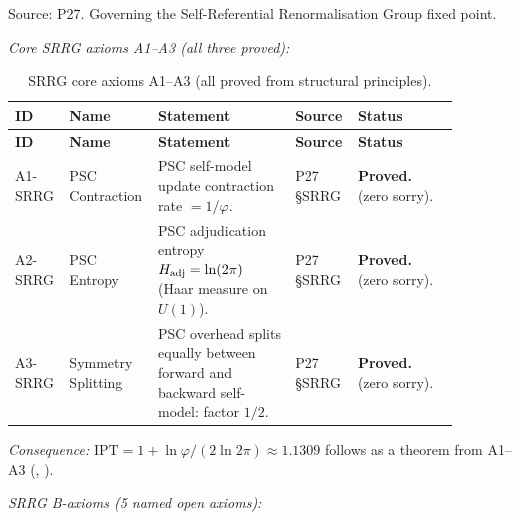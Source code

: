 Source: P27. Governing the Self-Referential Renormalisation Group fixed point.

\noindent\textit{Core SRRG axioms A1--A3 (all three proved):}

\begingroup\footnotesize\renewcommand{\arraystretch}{1.2}
\begin{longtable}{@{}P{0.10\linewidth}P{0.14\linewidth}P{0.30\linewidth}P{0.12\linewidth}P{0.22\linewidth}@{}}
\caption{SRRG core axioms A1--A3 (all proved from structural principles).}
\label{tab:mi-srrg-core}\\
\toprule
\textbf{ID} & \textbf{Name} & \textbf{Statement} & \textbf{Source} & \textbf{Status} \\
\midrule
\endfirsthead
\midrule
\textbf{ID} & \textbf{Name} & \textbf{Statement} & \textbf{Source} & \textbf{Status} \\
\midrule
\endhead
\bottomrule
\endfoot
A1-SRRG & PSC Contraction & PSC self-model update contraction rate $= 1/\varphi$. &
  P27 \S SRRG &
  \textbf{Proved.}  (zero sorry). \\
A2-SRRG & PSC Entropy & PSC adjudication entropy $H_{\rm adj} = \ln(2\pi)$
  (Haar measure on $U(1)$). &
  P27 \S SRRG &
  \textbf{Proved.}  (zero sorry). \\
A3-SRRG & Symmetry Splitting & PSC overhead splits equally between forward and backward
  self-model: factor $1/2$. &
  P27 \S SRRG &
  \textbf{Proved.}  (zero sorry). \\
\end{longtable}
\endgroup

\noindent\textit{Consequence:} $\mathrm{IPT} = 1 + \ln\varphi/(2\ln 2\pi) \approx 1.1309$ follows as a
theorem from A1--A3 (, \CatAL).

\medskip\noindent\textit{SRRG B-axioms (5 named open axioms):}

